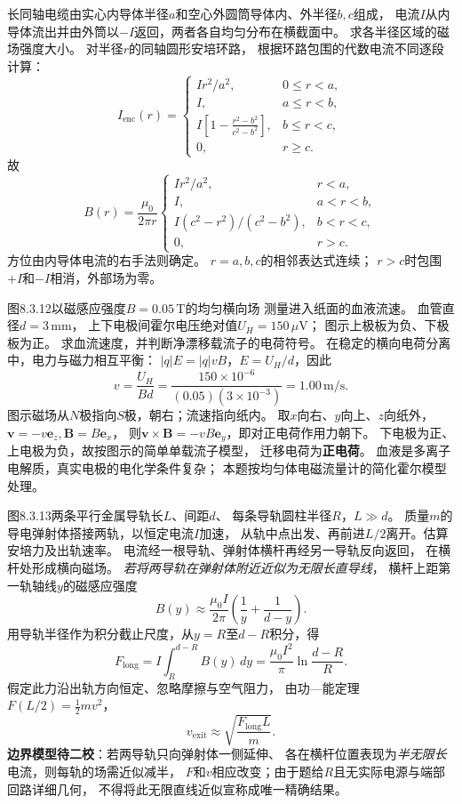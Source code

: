 \problemtext 长同轴电缆由实心内导体半径$a$和空心外圆筒导体内、外半径$b,c$组成，
电流$I$从内导体流出并由外筒以$-I$返回，两者各自均匀分布在横截面中。
求各半径区域的磁场强度大小。
\workings
对半径$r$的同轴圆形安培环路，
根据环路包围的代数电流不同逐段计算：
\[
I_{\mathrm{enc}}(r)=
\begin{cases}
I r^2/a^2,&0\le r<a,\\
I,&a\le r<b,\\
I\left[1-\frac{r^2-b^2}{c^2-b^2}\right],&b\le r<c,\\
0,&r\ge c.
\end{cases}
\]
故
\[
\boxed{B(r)=\frac{\mu_0}{2\pi r}
\begin{cases}
I r^2/a^2,&r<a,\\
I,&a<r<b,\\
I(c^2-r^2)/(c^2-b^2),&b<r<c,\\
0,&r>c.
\end{cases}}
\]
方位由内导体电流的右手法则确定。
\crosscheck $r=a,b,c$的相邻表达式连续；
$r>c$时包围$+I$和$-I$相消，外部场为零。

\problemtext 图8.3.12以磁感应强度$B=0.05\,\mathrm T$的均匀横向场
测量进入纸面的血液流速。
血管直径$d=3\,\mathrm{mm}$，
上下电极间霍尔电压绝对值$U_H=150\,\mu\mathrm V$；
图示上极板为负、下极板为正。
求血流速度，并判断净漂移载流子的电荷符号。
\workings
在稳定的横向电荷分离中，电力与磁力相互平衡：
$|q|E=|q|vB$，$E=U_H/d$，因此
\[
\boxed{v=\frac{U_H}{Bd}
=\frac{150\times10^{-6}}{(0.05)(3\times10^{-3})}
=1.00\,\mathrm{m/s}}.
\]
图示磁场从$N$极指向$S$极，朝右；流速指向纸内。
取$x$向右、$y$向上、$z$向纸外，
$\bm v=-v\bm e_z,\bm B=B\bm e_x$，
则$\bm v\times\bm B=-vB\bm e_y$，即对正电荷作用力朝下。
下电极为正、上电极为负，故按图示的简单单载流子模型，
迁移电荷为\textbf{正电荷}。
\crosscheck 血液是多离子电解质，真实电极的电化学条件复杂；
本题按均匀体电磁流量计的简化霍尔模型处理。

\problemtext 图8.3.13两条平行金属导轨长$L$、间距$d$、
每条导轨圆柱半径$R$，$L\gg d$。
质量$m$的导电弹射体搭接两轨，以恒定电流$I$加速，
从轨中点出发、再前进$L/2$离开。估算安培力及出轨速率。
\workings
电流经一根导轨、弹射体横杆再经另一导轨反向返回，
在横杆处形成横向磁场。
\emph{若将两导轨在弹射体附近近似为无限长直导线}，
横杆上距第一轨轴线$y$的磁感应强度
\[
B(y)\approx\frac{\mu_0I}{2\pi}
\left(\frac1y+\frac1{d-y}\right).
\]
用导轨半径作为积分截止尺度，从$y=R$至$d-R$积分，得
\[
\boxed{F_{\mathrm{long}}=
I\int_R^{d-R}B(y)\,dy
=\frac{\mu_0I^2}{\pi}
\ln\frac{d-R}{R}}.
\]
假定此力沿出轨方向恒定、忽略摩擦与空气阻力，
由功—能定理$F(L/2)=\tfrac12mv^2$，
\[
\boxed{v_{\mathrm{exit}}\approx
\sqrt{\frac{F_{\mathrm{long}}L}{m}}}.
\]
\crosscheck \textbf{边界模型待二校}：若两导轨只向弹射体一侧延伸、
各在横杆位置表现为\emph{半无限长}电流，则每轨的场需近似减半，
$F$和$v$相应改变；由于题给$R$且无实际电源与端部回路详细几何，
不得将此无限直线近似宣称成唯一精确结果。

